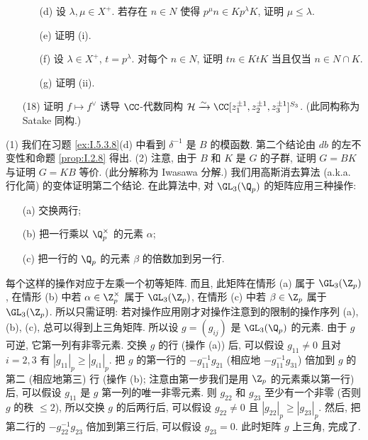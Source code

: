 \begin{enumerate}
\begin{enumerate}
\[\]
\item[(d)] 设 $\lambda, \mu \in X^+$. 若存在 $n \in N$ 使得 $p^{\mu}n \in Kp^{\lambda}K$, 证明 $\mu \leq \lambda$.
\item[(e)] 证明 (i).
\item[(f)] 设 $\lambda \in X^+$, $t = p^{\lambda}$. 对每个 $n \in N$, 证明 $tn \in KtK$ 当且仅当 $n \in N \cap K$.
\item[(g)] 证明 (ii).
\end{enumerate}
\item[(18)] 证明 $f \longmapsto f^{\vee}$ 诱导 $\CC$-代数同构 $\mathcal{H} \xrightarrow{\sim} \CC[z_1^{\pm 1}, z_2^{\pm 1}, z_3^{\pm 1}]^{S_3}$. (此同构称为 Satake 同构.)
\end{enumerate}

\begin{solution}
(1) 我们在习题 \ref{ex:I.5.3.8}(d) 中看到 $\delta^{-1}$ 是 $B$ 的模函数. 第二个结论由 $db$ 的左不变性和命题 \ref{prop:I.2.8} 得出.
(2) 注意, 由于 $B$ 和 $K$ 是 $G$ 的子群, 证明 $G = BK$ 与证明 $G = KB$ 等价. (此分解称为 Iwasawa 分解.) 我们用高斯消去算法 (a.k.a. 行化简) 的变体证明第二个结论. 在此算法中, 对 $\GL_3(\Q_p)$ 的矩阵应用三种操作:
\begin{itemize}
\item[(a)] 交换两行;
\item[(b)] 把一行乘以 $\Q_p^{\times}$ 的元素 $\alpha$;
\item[(c)] 把一行的 $\Q_p$ 的元素 $\beta$ 的倍数加到另一行.
\end{itemize}
每个这样的操作对应于左乘一个初等矩阵. 而且, 此矩阵在情形 (a) 属于 $\GL_3(\Z_p)$, 在情形 (b) 中若 $\alpha \in \Z_p^{\times}$ 属于 $\GL_3(\Z_p)$, 在情形 (c) 中若 $\beta \in \Z_p$ 属于 $\GL_3(\Z_p)$. 所以只需证明: 若对操作应用刚才对操作注意到的限制的操作序列 (a), (b), (c), 总可以得到上三角矩阵. 所以设 $g = (g_{ij})$ 是 $\GL_3(\Q_p)$ 的元素. 由于 $g$ 可逆, 它第一列有非零元素. 交换 $g$ 的行 (操作 (a)) 后, 可以假设 $g_{11} \neq 0$ 且对 $i = 2, 3$ 有 $|g_{11}|_p \geq |g_{i1}|_p$. 把 $g$ 的第一行的 $-g_{11}^{-1}g_{21}$ (相应地 $-g_{11}^{-1}g_{31}$) 倍加到 $g$ 的第二 (相应地第三) 行 (操作 (b); 注意由第一步我们是用 $\Z_p$ 的元素乘以第一行) 后, 可以假设 $g_{11}$ 是 $g$ 第一列的唯一非零元素. 则 $g_{22}$ 和 $g_{23}$ 至少有一个非零 (否则 $g$ 的秩 $\leq 2$), 所以交换 $g$ 的后两行后, 可以假设 $g_{22} \neq 0$ 且 $|g_{22}|_p \geq |g_{23}|_p$. 然后, 把第二行的 $-g_{22}^{-1}g_{23}$ 倍加到第三行后, 可以假设 $g_{23} = 0$. 此时矩阵 $g$ 上三角, 完成了.

\end{solution}
